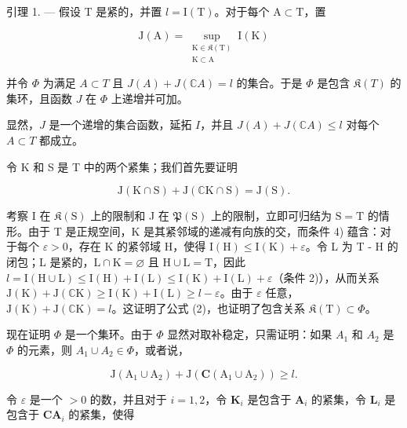 引理 1. --- 假设 T 是紧的，并置 \(l = \mathrm{I}(\mathrm{T})\)。对于每个 \(\mathrm{A} \subset \mathrm{T}\)，置

\[
\mathrm{J}(\mathrm{A}) = \sup_{\substack{\mathrm{K}\in \mathfrak{K}(\mathrm{T})\\ \mathrm{K}\subset \mathrm{A}}}\mathrm{I}(\mathrm{K})\tag{1}
\]

并令 \(\Phi\) 为满足 \(A \subset T\) 且 \(J(A) + J(\mathbb{C}A) = l\) 的集合。于是 \(\Phi\) 是包含 \(\mathfrak{K}(T)\) 的集环，且函数 \(J\) 在 \(\Phi\) 上递增并可加。

显然，\(J\) 是一个递增的集合函数，延拓 \(I\)，并且 \(J(A) + J(\mathbb{C}A) \leqslant l\) 对每个 \(A \subset T\) 都成立。

令 K 和 S 是 T 中的两个紧集；我们首先要证明

\[
\mathrm{J} (\mathrm{K} \cap \mathrm{S}) + \mathrm{J} (\mathbb {C} \mathrm{K} \cap \mathrm{S}) = \mathrm{J} (\mathrm{S}).\tag{2}
\]

考察 I 在 \(\mathfrak{K}(\mathrm{S})\) 上的限制和 J 在 \(\mathfrak{P}(\mathrm{S})\) 上的限制，立即可归结为 \(\mathrm{S} = \mathrm{T}\) 的情形。由于 T 是正规空间，K 是其紧邻域的递减有向族的交，而条件 4) 蕴含：对于每个 \(\varepsilon > 0\)，存在 K 的紧邻域 H，使得 \(\mathrm{I}(\mathrm{H}) \leqslant \mathrm{I}(\mathrm{K}) + \varepsilon\)。令 L 为 T - H 的闭包；L 是紧的，\(\mathrm{L} \cap \mathrm{K} = \varnothing\) 且 \(\mathrm{H} \cup \mathrm{L} = \mathrm{T}\)，因此 \(l = \mathrm{I}(\mathrm{H} \cup \mathrm{L}) \leqslant \mathrm{I}(\mathrm{H}) + \mathrm{I}(\mathrm{L}) \leqslant \mathrm{I}(\mathrm{K}) + \mathrm{I}(\mathrm{L}) + \varepsilon\)（条件 2)），从而关系 \(\mathrm{J}(\mathrm{K}) + \mathrm{J}(\mathbb{C}\mathrm{K}) \geqslant \mathrm{I}(\mathrm{K}) + \mathrm{I}(\mathrm{L}) \geqslant l - \varepsilon\)。由于 \(\varepsilon\) 任意，\(\mathrm{J}(\mathrm{K}) + \mathrm{J}(\mathbb{C}\mathrm{K}) = l\)。这证明了公式 (2)，也证明了包含关系 \(\mathfrak{K}(\mathrm{T}) \subset \Phi\)。

现在证明 \(\Phi\) 是一个集环。由于 \(\Phi\) 显然对取补稳定，只需证明：如果 \(A_{1}\) 和 \(A_{2}\) 是 \(\Phi\) 的元素，则 \(A_{1} \cup A_{2} \in \Phi\)，或者说，

\[
\mathrm{J} \left(\mathrm{A} _ {1} \cup \mathrm{A} _ {2}\right) + \mathrm{J} \left(\mathbf {C} \left(\mathrm{A} _ {1} \cup \mathrm{A} _ {2}\right)\right) \geqslant l.\tag{3}
\]

令 \(\varepsilon\) 是一个 \(>0\) 的数，并且对于 \(i = 1,2\)，令 \(\mathbf{K}_i\) 是包含于 \(\mathbf{A}_i\) 的紧集，令 \(\mathbf{L}_i\) 是包含于 \(\mathbf{C}\mathbf{A}_i\) 的紧集，使得

